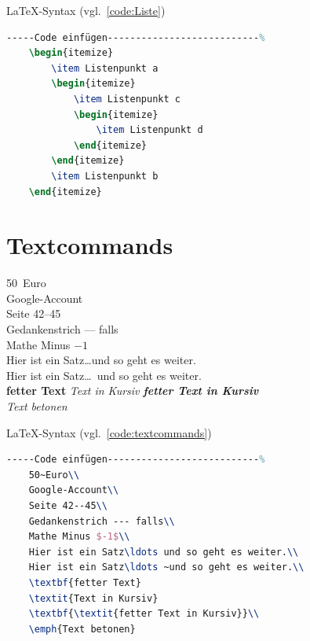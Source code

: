 \LaTeX -Syntax (vgl.~\ref{code:Liste})

\begin{lstlisting}[language=TeX,% C, TeX, Bash, Python
caption={Liste},label={code:Liste}%
]-----Code einfügen---------------------------%
	\begin{itemize}
		\item Listenpunkt a
		\begin{itemize}
			\item Listenpunkt c
			\begin{itemize}
				\item Listenpunkt d
			\end{itemize}
		\end{itemize}
		\item Listenpunkt b
	\end{itemize}	
\end{lstlisting}

\clearpage
\section{Textcommands}

50~Euro\\
Google-Account\\
Seite 42--45\\
Gedankenstrich --- falls\\
Mathe Minus $-1$\\
Hier ist ein Satz\ldots und so geht es weiter.\\
Hier ist ein Satz\ldots ~und so geht es weiter.\\
\textbf{fetter Text}
\textit{Text in Kursiv}
\textbf{\textit{fetter Text in Kursiv}}\\
\emph{Text betonen}


\LaTeX -Syntax (vgl.~\ref{code:textcommands})

\begin{lstlisting}[language=TeX,% C, TeX, Bash, Python
caption={Textcommands},label={code:textcommands}%
]-----Code einfügen---------------------------%
	50~Euro\\
	Google-Account\\
	Seite 42--45\\
	Gedankenstrich --- falls\\
	Mathe Minus $-1$\\
	Hier ist ein Satz\ldots und so geht es weiter.\\
	Hier ist ein Satz\ldots ~und so geht es weiter.\\
	\textbf{fetter Text}
	\textit{Text in Kursiv}
	\textbf{\textit{fetter Text in Kursiv}}\\
	\emph{Text betonen}
\end{lstlisting}

